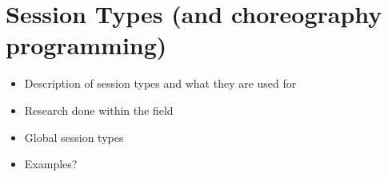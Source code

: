 \section{Session Types (and choreography programming)}
\begin{itemize}
  \item Description of session types and what they are used for
  \item Research done within the field
  \item Global session types
  \item Examples?
\end{itemize}